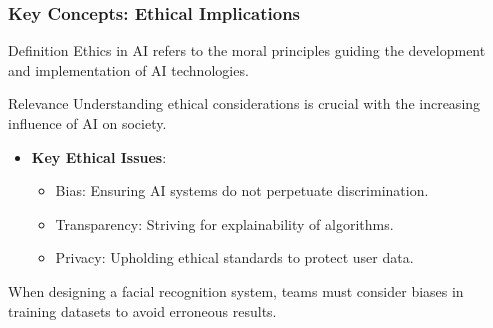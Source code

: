 \documentclass[aspectratio=169]{beamer}
\begin{document}
\begin{frame}[fragile]
    \frametitle{Key Concepts: Ethical Implications}
    \begin{block}{Definition}
        Ethics in AI refers to the moral principles guiding the development and implementation of AI technologies.
    \end{block}
    \begin{block}{Relevance}
        Understanding ethical considerations is crucial with the increasing influence of AI on society.
    \end{block}
    \begin{itemize}
        \item \textbf{Key Ethical Issues}:
        \begin{itemize}
            \item Bias: Ensuring AI systems do not perpetuate discrimination.
            \item Transparency: Striving for explainability of algorithms.
            \item Privacy: Upholding ethical standards to protect user data.
        \end{itemize}
    \end{itemize}
    \begin{example}
        When designing a facial recognition system, teams must consider biases in training datasets to avoid erroneous results.
    \end{example}
\end{frame}
\end{document}

